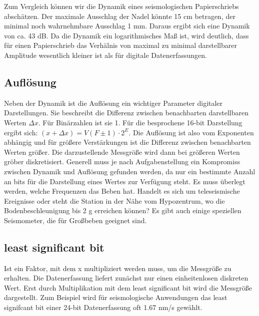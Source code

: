 Zum Vergleich können wir die Dynamik eines seismologischen Papierschriebs abschätzen. Der maximale Ausschlag der Nadel könnte 15 cm betragen, der minimal noch wahrnehmbare Ausschlag 1 mm. Daraus ergibt sich eine Dynamik von ca. 43 dB. Da die Dynamik ein logarithmisches Maß ist, wird deutlich, dass für einen Papierschrieb das Verhälnis von maximal zu minimal darstellbarer Amplitude wesentlich kleiner ist als für digitale Datenerfassungen. 
 

\subsection{Auflösung} 
Neben der Dynamik ist die Auflösung ein wichtiger Parameter digitaler Darstellungen. Sie beschreibt die Differenz zwischen benachbarten darstellbaren Werten $\Delta x$. Für Binärzahlen ist sie 1. Für die besprochene 16-bit Darstellung ergibt sich: $(x + \Delta x)= V( F\pm 1)\cdot 2^E$. Die Auflösung ist also vom Exponenten abhängig und für größere Verstärkungen ist die Differenz zwischen benachbarten Werten größer. Die darzustellende Messgröße wird dann bei größeren Werten gröber diskretisiert. Generell muss je nach Aufgabenstellung ein Kompromiss zwischen Dynamik und Auflösung gefunden werden, da nur ein bestimmte Anzahl an bits für die Darstellung eines Wertes zur Verfügung steht. Es muss überlegt werden, welche Frequenzen das Beben hat. Handelt es sich um teleseismische Ereignisse oder steht die Station in der Nähe vom Hypozentrum, wo die Bodenbeschleunigung bis 2 g erreichen können? Es gibt auch einige speziellen Seismometer, die für Großbeben geeignet sind. 

\subsection{least significant bit}
Ist ein Faktor, mit dem x multipliziert werden muss, um die Messgröße zu erhalten. Die Datenerfassung liefert zunächst nur einen einheitenlosen diskreten Wert. Erst durch Multiplikation mit dem least significant bit wird die Messgröße dargestellt. Zum Beispiel wird für seismologische Anwendungen das least signifcant bit einer 24-bit Datenerfassung oft 1.67 nm/s gewählt. 


